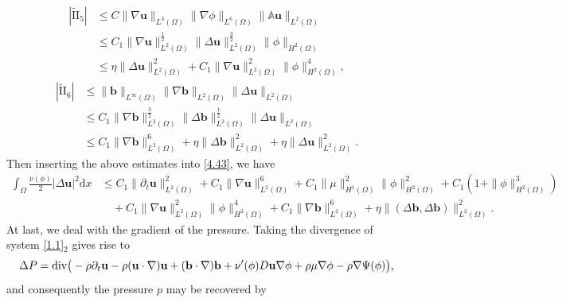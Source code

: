 \documentclass[11pt]{article}
\newcommand{\Dv}{{\rm div}}
\numberwithin{equation}{section}
\begin{document}
\begin{equation*}\label{4.48}
\begin{split}
| \tilde{\text{II}}_5|&\leq C\|\nabla\mathbf{u}\|_{L^3(\Omega)}\|\nabla\phi\|_{L^6(\Omega)}\|\mathbb{A}
\mathbf{u}\|_{L^2(\Omega)} \\
&\leq C_1\|\nabla\mathbf{u}\|_{L^2(\Omega)}^{\frac{1}{2}}
\|\Delta\mathbf{u}\|_{L^2(\Omega)}^{\frac{3}{2}}\|\phi\|_{H^2(\Omega)} \\
&\leq \eta\|\Delta\mathbf{u}\|_{L^2(\Omega)}^2 + C_1\|\nabla\mathbf{u}\|_{L^2(\Omega)}^2\|\phi\|_{H^2(\Omega)}^4,
\end{split}
\end{equation*}
\begin{equation*}\label{4.50}
\begin{split}
| \tilde{\text{II}}_6|&\leq \|\mathbf{b}\|_{L^{\infty}(\Omega)}\|\nabla\mathbf{b}\|_{L^2(\Omega)}
\|\Delta\mathbf{u}\|_{L^2(\Omega)} \\
&\leq C_1\|\nabla\mathbf{b}\|_{L^2(\Omega)}^{\frac{3}{2}}
\|\Delta\mathbf{b}\|_{L^2(\Omega)}^{\frac{1}{2}}
\|\Delta\mathbf{u}\|_{L^2(\Omega)}
\\&\leq C_1\|\nabla\mathbf{b}\|_{L^2(\Omega)}^{6}+\eta
\|\Delta\mathbf{b}\|_{L^2(\Omega)}^{2}
+\eta\|\Delta\mathbf{u}\|_{L^2(\Omega)}^2.
\end{split}
\end{equation*}
Then inserting the above estimates into \eqref{4.43}, we have
\begin{equation}\label{4.43AA}
\begin{split}
\int_{\Omega}\frac{\nu(\phi)}{2}|\Delta\mathbf{u}|^2\mathrm{d}x
&\leq C_1\|\partial_t\mathbf{u}\|_{L^2(\Omega)}^2+C_1\|\nabla\mathbf{u}\|_{L^2(\Omega)}^6+C_1\|\mu\|_{H^1(\Omega)}^2\|\phi\|_{H^2(\Omega)}^2
 +C_1(1 + \|\phi\|_{H^2(\Omega)}^3)\\&\quad+ C_1\|\nabla\mathbf{u}\|_{L^2(\Omega)}^2\|\phi\|_{H^2(\Omega)}^4+C_1\|\nabla\mathbf{b}\|_{L^2(\Omega)}^{6}+\eta
\|(\Delta\mathbf{b},\Delta\mathbf{b})\|_{L^2(\Omega)}^{2}.
\end{split}
\end{equation}
At last, we deal with  the gradient of the pressure. Taking the divergence of system  \eqref{1.1}$_{2}$  gives rise to
\begin{equation*}\Delta P=\Dv\big(-\rho\partial_t\mathbf{u}-\rho(\mathbf{u}\cdot\nabla)\mathbf{u}+(\mathbf{b}\cdot\nabla)\mathbf{b}+\nu'(\phi)D\mathbf{u}\nabla\phi+\rho\mu\nabla\phi-\rho\nabla\Psi(\phi)\big),
\end{equation*} and consequently the pressure $p$ may be recovered by
\end{document}
